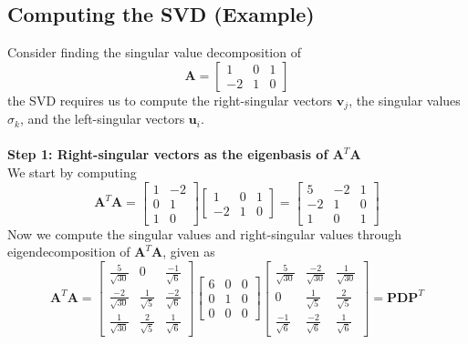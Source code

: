 \documentclass{report}
\begin{document}
\subsection{Computing the SVD (Example)}%
Consider finding the singular value decomposition of
\begin{equation*}
\bm{A}=\begin{bmatrix}1&0&1\\
-2&1&0\end{bmatrix}
\end{equation*}
the SVD requires us to compute the right-singular vectors $\bm{v}_j$, the singular values $\sigma_k$, and the
left-singular vectors $\bm{u}_i$.\\
\vspace{1mm}\\
\textbf{Step 1: Right-singular vectors as the eigenbasis of $\bm{A}^T\bm{A}$}\\
We start by computing 
\begin{equation*}
\bm{A}^T\bm{A}=\begin{bmatrix}
1&-2\\0&1\\1&0
\end{bmatrix}\begin{bmatrix}
1&0&1\\-2&1&0\end{bmatrix}=\begin{bmatrix}
5&-2&1\\-2&1&0\\1&0&1
\end{bmatrix}
\end{equation*}
Now we compute the singular values and right-singular values through eigendecomposition of $\bm{A}^T\bm{A}$,
given as
\begin{equation*}
\bm{A}^T\bm{A}=\begin{bmatrix}
\frac{5}{\sqrt{30}}&0&\frac{-1}{\sqrt{6}}\\
\frac{-2}{\sqrt{30}}&\frac{1}{\sqrt{5}}&\frac{-2}{\sqrt{6}}\\
\frac{1}{\sqrt{30}}&\frac{2}{\sqrt{5}}&\frac{1}{\sqrt{6}}
\end{bmatrix}\begin{bmatrix}6&0&0\\0&1&0\\0&0&0
\end{bmatrix}\begin{bmatrix}
\frac{5}{\sqrt{30}}&\frac{-2}{\sqrt{30}}&\frac{1}{\sqrt{30}}\\
0&\frac{1}{\sqrt{5}}&\frac{2}{\sqrt{5}}\\
\frac{-1}{\sqrt{6}}&\frac{-2}{\sqrt{6}}&\frac{1}{\sqrt{6}}
\end{bmatrix}=\bm{PDP}^T
\end{equation*}
\end{document}
